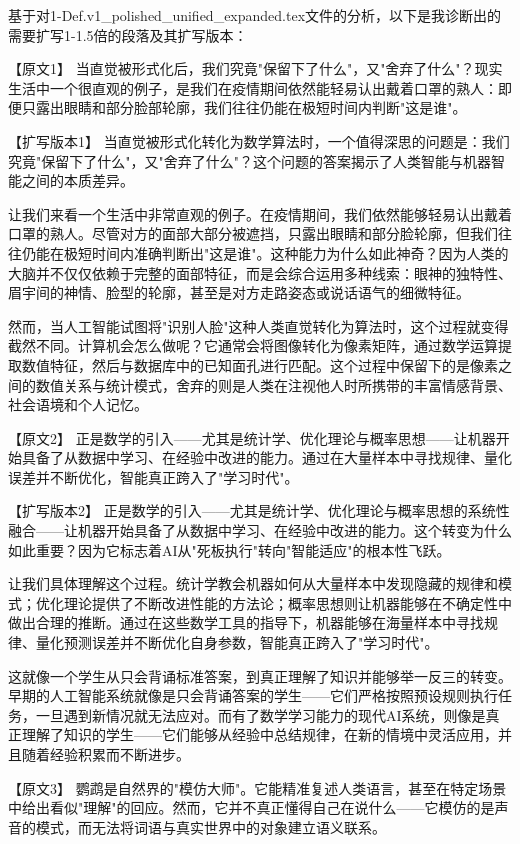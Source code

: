 基于对1-Def.v1_polished_unified_expanded.tex文件的分析，以下是我诊断出的需要扩写1-1.5倍的段落及其扩写版本：

【原文1】
当直觉被形式化后，我们究竟"保留下了什么"，又"舍弃了什么"？现实生活中一个很直观的例子，是我们在疫情期间依然能轻易认出戴着口罩的熟人：即便只露出眼睛和部分脸部轮廓，我们往往仍能在极短时间内判断"这是谁"。

【扩写版本1】
当直觉被形式化转化为数学算法时，一个值得深思的问题是：我们究竟"保留下了什么"，又"舍弃了什么"？这个问题的答案揭示了人类智能与机器智能之间的本质差异。

让我们来看一个生活中非常直观的例子。在疫情期间，我们依然能够轻易认出戴着口罩的熟人。尽管对方的面部大部分被遮挡，只露出眼睛和部分脸轮廓，但我们往往仍能在极短时间内准确判断出"这是谁"。这种能力为什么如此神奇？因为人类的大脑并不仅仅依赖于完整的面部特征，而是会综合运用多种线索：眼神的独特性、眉宇间的神情、脸型的轮廓，甚至是对方走路姿态或说话语气的细微特征。

然而，当人工智能试图将"识别人脸"这种人类直觉转化为算法时，这个过程就变得截然不同。计算机会怎么做呢？它通常会将图像转化为像素矩阵，通过数学运算提取数值特征，然后与数据库中的已知面孔进行匹配。这个过程中保留下的是像素之间的数值关系与统计模式，舍弃的则是人类在注视他人时所携带的丰富情感背景、社会语境和个人记忆。

【原文2】
正是数学的引入——尤其是统计学、优化理论与概率思想——让机器开始具备了从数据中学习、在经验中改进的能力。通过在大量样本中寻找规律、量化误差并不断优化，智能真正跨入了"学习时代"。

【扩写版本2】
正是数学的引入——尤其是统计学、优化理论与概率思想的系统性融合——让机器开始具备了从数据中学习、在经验中改进的能力。这个转变为什么如此重要？因为它标志着AI从"死板执行"转向"智能适应"的根本性飞跃。

让我们具体理解这个过程。统计学教会机器如何从大量样本中发现隐藏的规律和模式；优化理论提供了不断改进性能的方法论；概率思想则让机器能够在不确定性中做出合理的推断。通过在这些数学工具的指导下，机器能够在海量样本中寻找规律、量化预测误差并不断优化自身参数，智能真正跨入了"学习时代"。

这就像一个学生从只会背诵标准答案，到真正理解了知识并能够举一反三的转变。早期的人工智能系统就像是只会背诵答案的学生——它们严格按照预设规则执行任务，一旦遇到新情况就无法应对。而有了数学学习能力的现代AI系统，则像是真正理解了知识的学生——它们能够从经验中总结规律，在新的情境中灵活应用，并且随着经验积累而不断进步。

【原文3】
鹦鹉是自然界的"模仿大师"。它能精准复述人类语言，甚至在特定场景中给出看似"理解"的回应。然而，它并不真正懂得自己在说什么——它模仿的是声音的模式，而无法将词语与真实世界中的对象建立语义联系。

